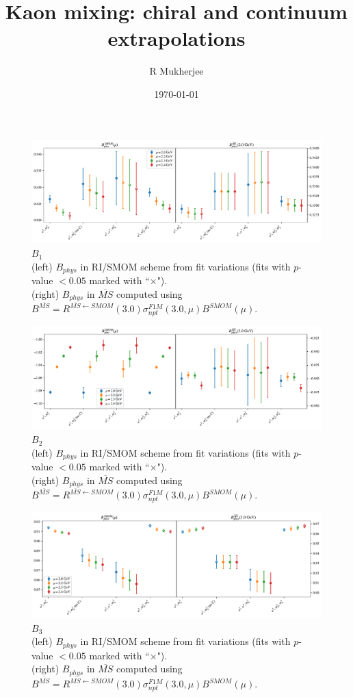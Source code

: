 \documentclass[12pt]{extarticle}
\title{Kaon mixing: chiral and continuum extrapolations}
\author{R Mukherjee}
\date{\today}
\begin{document}
\maketitle
\tableofcontents
\clearpage
\begin{figure}
\centering
\includegraphics[page=1, width=1.1\textwidth]{VVpAA/NPR/fit_summary.pdf}
\caption{$B_{1}$\\(left) $B_{phys}$ in RI/SMOM scheme from fit variations (fits with $p$-value $<0.05$ marked with ``$\times$"). \\(right) $B_{phys}$ in $\overline{MS}$ computed using $B^{\overline{MS}} = R^{\overline{MS}\leftarrow SMOM}(3.0)\sigma_{npt}^{F1M}(3.0,\mu) B^{SMOM}(\mu)$.}
\end{figure}
\clearpage
\begin{figure}
\centering
\includegraphics[page=1, width=1.1\textwidth]{VVmAA/NPR/fit_summary.pdf}
\caption{$B_{2}$\\(left) $B_{phys}$ in RI/SMOM scheme from fit variations (fits with $p$-value $<0.05$ marked with ``$\times$"). \\(right) $B_{phys}$ in $\overline{MS}$ computed using $B^{\overline{MS}} = R^{\overline{MS}\leftarrow SMOM}(3.0)\sigma_{npt}^{F1M}(3.0,\mu) B^{SMOM}(\mu)$.}
\end{figure}
\clearpage
\begin{figure}
\centering
\includegraphics[page=1, width=1.1\textwidth]{SSmPP/NPR/fit_summary.pdf}
\caption{$B_{3}$\\(left) $B_{phys}$ in RI/SMOM scheme from fit variations (fits with $p$-value $<0.05$ marked with ``$\times$"). \\(right) $B_{phys}$ in $\overline{MS}$ computed using $B^{\overline{MS}} = R^{\overline{MS}\leftarrow SMOM}(3.0)\sigma_{npt}^{F1M}(3.0,\mu) B^{SMOM}(\mu)$.}
\end{figure}
\end{document}
